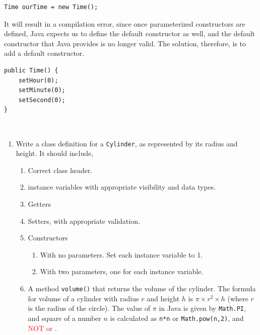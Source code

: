 \begin{questions}
\begin{parts}
\begin{lstlisting}
Time ourTime = new Time();
\end{lstlisting}

\begin{solution}
It will result in a compilation error, since once parameterized constructors are defined, Java expects us to define the default constructor as well, and the default constructor that Java provides is no longer valid. The solution, therefore, is to add a default constructor.

\begin{lstlisting}
public Time() {
	setHour(0);
	setMinute(0);
	setSecond(0);
}
\end{lstlisting}
\end{solution}
\end{parts}

\vskip 0.5cm

\\

\begin{enumerate}
\item Write a class definition for a \texttt{Cylinder}, as represented by its radius and height. It should include,

\begin{enumerate}
\item Correct class header.
\item instance variables with appropriate visibility and data types.
\item Getters
\item Setters, with appropriate validation.
\item Constructors
	\begin{enumerate}
		\item With no parameters. Set each instance variable to 1.
		\item With two parameters, one for each instance variable.
	\end{enumerate}
\item A method \texttt{volume()} that returns the volume of the cylinder. The formula for volume of a cylinder with radius $r$ and height $h$ is $\pi \times r^2 \times h$ (where $r$ is the radius of the circle). The value of $\pi$ in Java is given by \texttt{Math.PI}, and square of a number $n$ is calculated as \texttt{n*n} or \texttt{Math.pow(n,2)}, and \textcolor{red}{NOT  or }.
\end{enumerate}


\end{enumerate}
\end{questions}
